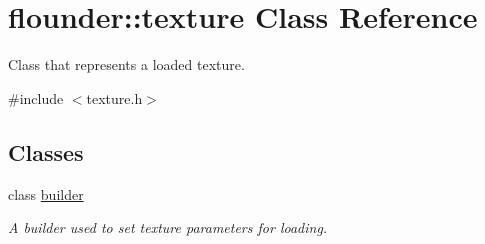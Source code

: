 \hypertarget{classflounder_1_1texture}{}\section{flounder\+:\+:texture Class Reference}
\label{classflounder_1_1texture}


Class that represents a loaded texture.  




{\ttfamily \#include $<$texture.\+h$>$}

\subsection*{Classes}
\begin{DoxyCompactItemize}
\item 
class \hyperlink{classflounder_1_1texture_1_1builder}{builder}
\begin{DoxyCompactList}\small\item\em A builder used to set texture parameters for loading. \end{DoxyCompactList}\end{DoxyCompactItemize}
